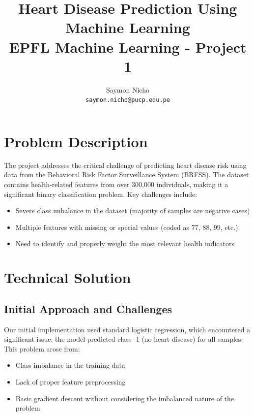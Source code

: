 \documentclass[10pt,conference,compsocconf]{IEEEtran}
\title{Heart Disease Prediction Using Machine Learning\\
EPFL Machine Learning - Project 1}
\author{
  Saymon Nicho\\
  \texttt{saymon.nicho@pucp.edu.pe}
}
\begin{document}
\maketitle

\section{Problem Description}
The project addresses the critical challenge of predicting heart disease risk using data
from the Behavioral Risk Factor Surveillance System (BRFSS). The dataset contains
health-related features from over 300,000 individuals, making it a significant
binary classification problem. Key challenges include:

\begin{itemize}
    \item Severe class imbalance in the dataset (majority of samples are negative cases)
    \item Multiple features with missing or special values (coded as 77, 88, 99, etc.)
    \item Need to identify and properly weight the most relevant health indicators
\end{itemize}


\section{Technical Solution}
\subsection{Initial Approach and Challenges}
Our initial implementation used standard logistic regression, which encountered a significant issue: the model predicted class -1 (no heart disease) for all samples. This problem arose from:

\begin{itemize}
    \item Class imbalance in the training data
    \item Lack of proper feature preprocessing
    \item Basic gradient descent without considering the imbalanced nature of the problem
\end{itemize}
\end{document}
